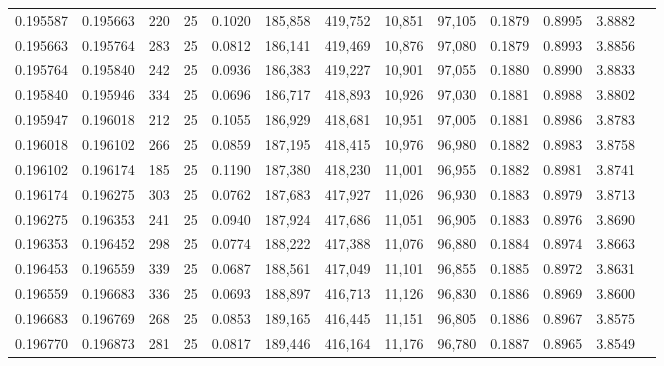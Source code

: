 \begin{tabular}{rrrrrrrrrrrrr}
0.195587 & 0.195663 &   220 &  25 &                                     0.1020 & 185,858 & 419,752 &  10,851 &  97,105 & 0.1879 & 0.8995 & 3.8882 \\
0.195663 & 0.195764 &   283 &  25 &                                     0.0812 & 186,141 & 419,469 &  10,876 &  97,080 & 0.1879 & 0.8993 & 3.8856 \\
0.195764 & 0.195840 &   242 &  25 &                                     0.0936 & 186,383 & 419,227 &  10,901 &  97,055 & 0.1880 & 0.8990 & 3.8833 \\
0.195840 & 0.195946 &   334 &  25 &                                     0.0696 & 186,717 & 418,893 &  10,926 &  97,030 & 0.1881 & 0.8988 & 3.8802 \\
0.195947 & 0.196018 &   212 &  25 &                                     0.1055 & 186,929 & 418,681 &  10,951 &  97,005 & 0.1881 & 0.8986 & 3.8783 \\
0.196018 & 0.196102 &   266 &  25 &                                     0.0859 & 187,195 & 418,415 &  10,976 &  96,980 & 0.1882 & 0.8983 & 3.8758 \\
0.196102 & 0.196174 &   185 &  25 &                                     0.1190 & 187,380 & 418,230 &  11,001 &  96,955 & 0.1882 & 0.8981 & 3.8741 \\
0.196174 & 0.196275 &   303 &  25 &                                     0.0762 & 187,683 & 417,927 &  11,026 &  96,930 & 0.1883 & 0.8979 & 3.8713 \\
0.196275 & 0.196353 &   241 &  25 &                                     0.0940 & 187,924 & 417,686 &  11,051 &  96,905 & 0.1883 & 0.8976 & 3.8690 \\
0.196353 & 0.196452 &   298 &  25 &                                     0.0774 & 188,222 & 417,388 &  11,076 &  96,880 & 0.1884 & 0.8974 & 3.8663 \\
0.196453 & 0.196559 &   339 &  25 &                                     0.0687 & 188,561 & 417,049 &  11,101 &  96,855 & 0.1885 & 0.8972 & 3.8631 \\
0.196559 & 0.196683 &   336 &  25 &                                     0.0693 & 188,897 & 416,713 &  11,126 &  96,830 & 0.1886 & 0.8969 & 3.8600 \\
0.196683 & 0.196769 &   268 &  25 &                                     0.0853 & 189,165 & 416,445 &  11,151 &  96,805 & 0.1886 & 0.8967 & 3.8575 \\
0.196770 & 0.196873 &   281 &  25 &                                     0.0817 & 189,446 & 416,164 &  11,176 &  96,780 & 0.1887 & 0.8965 & 3.8549 \\

\end{tabular}
